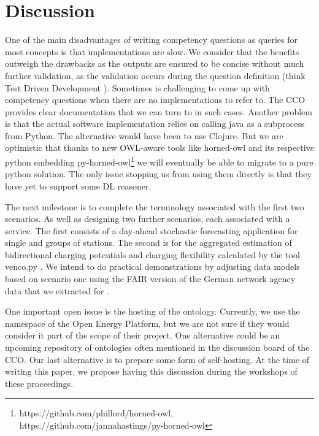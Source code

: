\section{Discussion}
\label{discussion}

One of the main disadvantages of writing competency questions as queries for
most concepts is that implementations are slow. We consider that the benefits
outweigh the drawbacks as the outputs are ensured to be concise without much
further validation, as the validation occurs during the question definition
(think Test Driven Development \cite{ArellanoRuiz.2022}). Sometimes is
challenging to come up with competency questions when there are no
implementations to refer to. The CCO provides clear documentation that we can
turn to in such cases. Another problem is that the actual software implementation
relies on calling java as a subprocess from Python. The alternative would have
been to use Clojure. But we are optimistic that thanks to new OWL-aware
tools like horned-owl and its respective python embedding
py-horned-owl\footnote{https://github.com/phillord/horned-owl,
https://github.com/jannahastings/py-horned-owl} we will eventually be able to
migrate to a pure python solution. The only issue stopping us from using them
directly is that they have yet to support some DL reasoner.

The next milestone is to complete the terminology associated with the first two
scenarios. As well as designing two further scenarios, each associated with a
service. The first consists of a day-ahead stochastic forecasting application
for single and groups of stations. The second is for the aggregated
estimation of bidirectional charging potentials and charging flexibility
calculated by the tool {venco.py} \cite{Miorelli.2024}.  
We intend to do practical demonstrations  by adjusting data models based on
scenario one using the FAIR version of the German network agency data that we
extracted for \cite{ArellanoRuiz.2024}.

One important open issue is the hosting of the ontology. Currently, we use the
namespace of the Open Energy Platform, but we are not sure if they would
consider it part of the scope of their project. One alternative could be an
upcoming repository of ontologies often mentioned in the discussion board of the
CCO. Our last alternative is to prepare some form of self-hosting. At the time
of writing this paper, we propose having this discussion during the workshops of
these proceedings.
